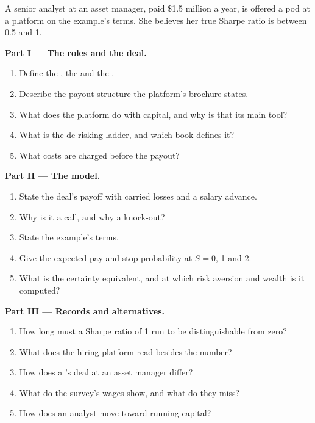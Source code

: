 \begin{problem}\label{pb:in:portfolio-manager-and-pod-analyst:1}
A senior analyst at an asset manager, paid \$1.5 million a year, is offered a pod at a platform on the example's terms.
She believes her true Sharpe ratio is between 0.5 and 1.

\medskip\noindent\textbf{Part I --- The roles and the deal.}
\begin{enumerate}
\item Define the , the  and the .
\item Describe the payout structure the platform's brochure states.
\item What does the platform do with capital, and why is that its main tool?
\item What is the de-risking ladder, and which book defines it?
\item What costs are charged before the payout?
\end{enumerate}

\medskip\noindent\textbf{Part II --- The model.}
\begin{enumerate}[resume]
\item State the deal's payoff with carried losses and a salary advance.
\item Why is it a call, and why a knock-out?
\item State the example's terms.
\item Give the expected pay and stop probability at $S=0$, 1 and 2.
\item What is the certainty equivalent, and at which risk aversion and wealth is it computed?
\end{enumerate}

\medskip\noindent\textbf{Part III --- Records and alternatives.}
\begin{enumerate}[resume]
\item How long must a Sharpe ratio of 1 run to be distinguishable from zero?
\item What does the hiring platform read besides the number?
\item How does a 's deal at an asset manager differ?
\item What do the survey's wages show, and what do they miss?
\item How does an analyst move toward running capital?
\end{enumerate}


\end{problem}
